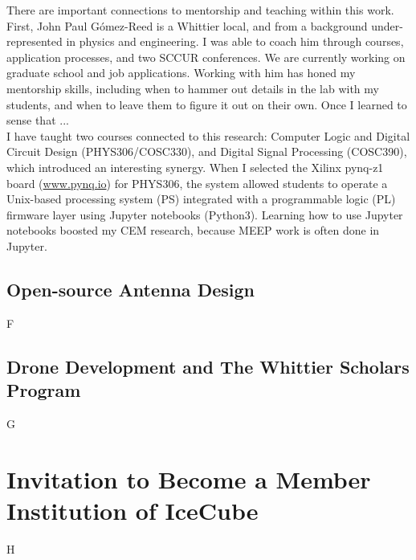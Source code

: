 \documentclass[../../../main.tex]{subfiles}
\begin{document}
There are important connections to mentorship and teaching within this work.  First, John Paul G\'{o}mez-Reed is a Whittier local, and from a background under-represented in physics and engineering.  I was able to coach him through courses, application processes, and two SCCUR conferences.  We are currently working on graduate school and job applications.  Working with him has honed my mentorship skills, including when to hammer out details in the lab with my students, and when to leave them to figure it out on their own.  Once I learned to sense that ...
\\
\vspace{0.25cm}
I have taught two courses connected to this research: Computer Logic and Digital Circuit Design (PHYS306/COSC330), and Digital Signal Processing (COSC390), which introduced an interesting synergy.  When I selected the Xilinx pynq-z1 board (\url{www.pynq.io}) for PHYS306, the system allowed students to operate a Unix-based processing system (PS) integrated with a programmable logic (PL) firmware layer using Jupyter notebooks (Python3).  Learning how to use Jupyter notebooks boosted my CEM research, because MEEP work is often done in Jupyter.

\subsection{Open-source Antenna Design}
F
\subsection{Drone Development and The Whittier Scholars Program}
G
\section{Invitation to Become a Member Institution of IceCube}
H
\end{document}
